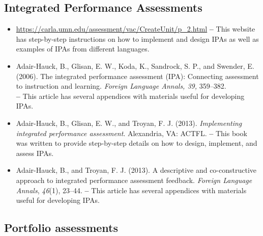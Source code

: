 \documentclass[output=paper]{langscibook}
\begin{document}
\subsection*{Integrated Performance Assessments}

\begin{itemize}
\item \url{https://carla.umn.edu/assessment/vac/CreateUnit/p_2.html} \textbf{--} This website has step-by-step instructions on how to implement and design IPAs as well as examples of IPAs from different languages.
\end{itemize}
\begin{itemize}
\item Adair-Hauck, B., Glisan, E. W., Koda, K., Sandrock, S. P., and Swender, E. (2006). The integrated performance assessment (IPA): Connecting assessment to instruction and learning. \textit{Foreign Lan\-guage Annals, 39,} 359--382.\\\textbf{-- }This article has several appendices with materials useful for developing IPAs.
\end{itemize}
\begin{itemize}
\item Adair-Hauck, B., Glisan, E. W., and Troyan, F. J. (2013). \textit{Implementing integrated performance assessment}. Alexandria, VA: ACTFL. \textbf{-- }This book was written to provide step-by-step details on how to design, implement, and assess IPAs.
\end{itemize}
\begin{itemize}
\item \begin{sloppypar}Adair-Hauck, B., and Troyan, F. J. (2013). A descriptive and co-constructive approach to integrated performance assessment feedback. \textit{Foreign Lan\-guage Annals}, \textit{46}(1), 23--44. \textbf{-- }This article has several appendices with materials useful for developing IPAs.\end{sloppypar}
\end{itemize}

\subsection*{Portfolio assessments}
\end{document}
